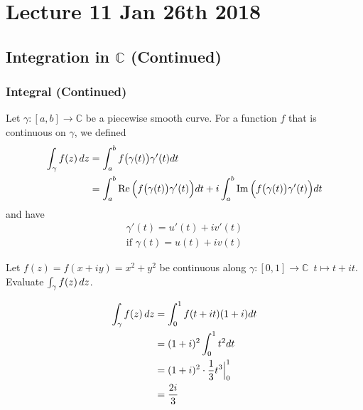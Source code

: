\documentclass[11pt, oneside]{book}
\begin{document}



\chapter{Lecture 11 Jan 26th 2018}
	\label{chapter:lecture_11_jan_26th_2018}

\section{Integration in \texorpdfstring{$\mathbb{C}$}{C} (Continued)} %
\label{sec:integration_in_c_continued}

\subsection{Integral (Continued)} %
\label{sub:integral_continued}

\begin{note}[Recall]
	Let $\gamma: [a, b] \to \mathbb{C}$ be a piecewise smooth curve. For a function $f$ that is continuous on $\gamma$, we defined
	\begin{align*}
		\int_{\gamma} f(z) \mathop{}\!d{z}
			&= \int_{a}^{b} f\big( \gamma(t) \big) \gamma'(t) dt \\
			&= \int_{a}^{b} \operatorname{Re}\Big(f\big( \gamma(t) \big) \gamma'(t) \Big) dt + i \int_{a}^{b} \operatorname{Im}\Big(f\big( \gamma(t) \big) \gamma'(t) \Big) dt
	\end{align*}
	and have
	\begin{gather*}
		\gamma'(t) = u'(t) + iv'(t) \\
		\text{if } \gamma(t) = u(t) + iv(t)
	\end{gather*}
\end{note}

\begin{eg}
	Let $f(z) = f(x + iy) = x^2 + y^2$ be continuous along $\gamma : [0, 1] \to \mathbb{C} \enspace t \mapsto t + it$. Evaluate $\int_{\gamma} f(z) \mathop{}\!d{z}$.
	\begin{solution}
		\begin{align*}
			\int_{\gamma} f(z) \mathop{}\!d{z}
				&= \int_{0}^{1} f(t + it)(1 + i) dt \\
				&= (1 + i)^2 \int_{0}^{1} t^2 dt \\
				&= (1 + i)^2 \cdot \frac{1}{3} t^3 \Big|_{0}^{1} \\
				&= \frac{2i}{3}
		\end{align*}
	\end{solution}
\end{eg}
\end{document}
